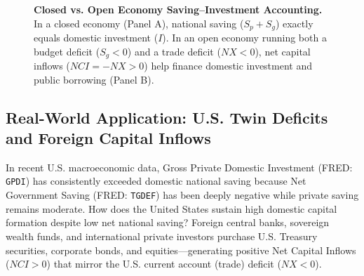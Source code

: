 \documentclass[11pt,letterpaper]{article}
\begin{document}
\begin{figure}[h!]
  \caption{\textbf{Closed vs. Open Economy Saving--Investment Accounting.} In a closed economy (Panel A), national saving ($S_p + S_g$) exactly equals domestic investment ($I$). In an open economy running both a budget deficit ($S_g < 0$) and a trade deficit ($NX < 0$), net capital inflows ($NCI = -NX > 0$) help finance domestic investment and public borrowing (Panel B).}
  \label{fig:ch7-closed-open}
\end{figure}

\subsection*{Real-World Application: U.S. Twin Deficits and Foreign Capital Inflows}
In recent U.S. macroeconomic data, Gross Private Domestic Investment (FRED: \texttt{GPDI}) has consistently exceeded domestic national saving because Net Government Saving (FRED: \texttt{TGDEF}) has been deeply negative while private saving remains moderate. How does the United States sustain high domestic capital formation despite low net national saving? Foreign central banks, sovereign wealth funds, and international private investors purchase U.S. Treasury securities, corporate bonds, and equities—generating positive Net Capital Inflows ($NCI > 0$) that mirror the U.S. current account (trade) deficit ($NX < 0$).
\end{document}
